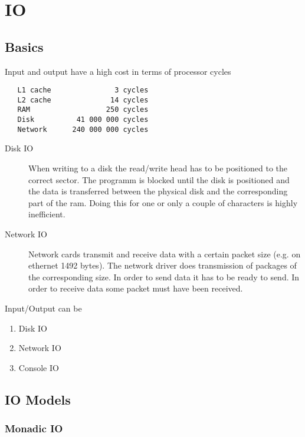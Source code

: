 \chapter{IO}

\section{Basics}

Input and output have a high cost in terms of processor cycles
{\small
\begin{verbatim}
   L1 cache               3 cycles
   L2 cache              14 cycles
   RAM                  250 cycles
   Disk          41 000 000 cycles
   Network      240 000 000 cycles
\end{verbatim}
}
%
\begin{description}

\item[Disk IO] When writing to a disk the read/write head has to be positioned
  to the correct sector. The programm is blocked until the disk is positioned
  and the data is transferred between the physical disk and the corresponding
  part of the ram. Doing this for one or only a couple of characters is highly
  inefficient.

\item[Network IO] Network cards transmit and receive data with a certain
  packet size (e.g. on ethernet 1492 bytes). The network driver does
  transmission of packages of the corresponding size. In order to send data it
  has to be ready to send. In order to receive data some packet must have been
  received.
\end{description}



Input/Output can be
\begin{enumerate}
\item Disk IO

\item Network IO

\item Console IO
\end{enumerate}





\section{IO Models}



\subsection{Monadic IO}

